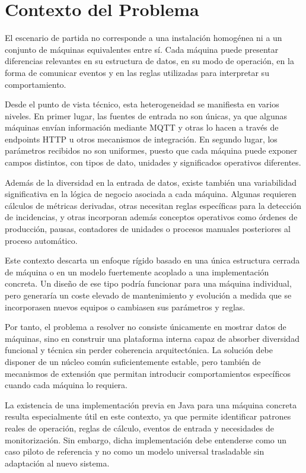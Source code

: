 \section{Contexto del Problema}

El escenario de partida no corresponde a una instalación homogénea ni a un conjunto de máquinas equivalentes entre sí. Cada máquina puede presentar diferencias relevantes en su estructura de datos, en su modo de operación, en la forma de comunicar eventos y en las reglas utilizadas para interpretar su comportamiento.

Desde el punto de vista técnico, esta heterogeneidad se manifiesta en varios niveles. En primer lugar, las fuentes de entrada no son únicas, ya que algunas máquinas envían información mediante MQTT y otras lo hacen a través de endpoints HTTP u otros mecanismos de integración. En segundo lugar, los parámetros recibidos no son uniformes, puesto que cada máquina puede exponer campos distintos, con tipos de dato, unidades y significados operativos diferentes.

Además de la diversidad en la entrada de datos, existe también una variabilidad significativa en la lógica de negocio asociada a cada máquina. Algunas requieren cálculos de métricas derivadas, otras necesitan reglas específicas para la detección de incidencias, y otras incorporan además conceptos operativos como órdenes de producción, pausas, contadores de unidades o procesos manuales posteriores al proceso automático.

Este contexto descarta un enfoque rígido basado en una única estructura cerrada de máquina o en un modelo fuertemente acoplado a una implementación concreta. Un diseño de ese tipo podría funcionar para una máquina individual, pero generaría un coste elevado de mantenimiento y evolución a medida que se incorporasen nuevos equipos o cambiasen sus parámetros y reglas.

Por tanto, el problema a resolver no consiste únicamente en mostrar datos de máquinas, sino en construir una plataforma interna capaz de absorber diversidad funcional y técnica sin perder coherencia arquitectónica. La solución debe disponer de un núcleo común suficientemente estable, pero también de mecanismos de extensión que permitan introducir comportamientos específicos cuando cada máquina lo requiera.

La existencia de una implementación previa en Java para una máquina concreta resulta especialmente útil en este contexto, ya que permite identificar patrones reales de operación, reglas de cálculo, eventos de entrada y necesidades de monitorización. Sin embargo, dicha implementación debe entenderse como un caso piloto de referencia y no como un modelo universal trasladable sin adaptación al nuevo sistema.